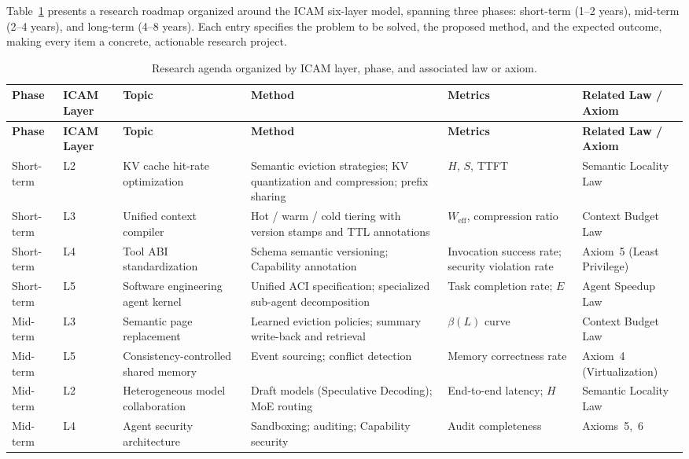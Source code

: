 \documentclass[11pt,a4paper]{article}
\newcounter{axiom}[section]
\begin{document}
Table~\ref{tab:roadmap} presents a research roadmap organized around the ICAM six-layer model, spanning three phases: short-term (1--2 years), mid-term (2--4 years), and long-term (4--8 years). Each entry specifies the problem to be solved, the proposed method, and the expected outcome, making every item a concrete, actionable research project.

\footnotesize
\renewcommand{\arraystretch}{1.35}
\begin{longtable}{p{}p{}p{}p{}p{}p{}}
\caption{Research agenda organized by ICAM layer, phase, and associated law or axiom.}
\label{tab:roadmap}\\
\toprule
\textbf{Phase} & \textbf{ICAM Layer} & \textbf{Topic} & \textbf{Method} & \textbf{Metrics} & \textbf{Related Law / Axiom} \\
\midrule
\endfirsthead
\toprule
\textbf{Phase} & \textbf{ICAM Layer} & \textbf{Topic} & \textbf{Method} & \textbf{Metrics} & \textbf{Related Law / Axiom} \\
\midrule
\endhead

Short-term & L2 & KV cache hit-rate optimization & Semantic eviction strategies; KV quantization and compression; prefix sharing & $H$, $S$, TTFT & Semantic Locality Law \\[3pt]
Short-term & L3 & Unified context compiler & Hot / warm / cold tiering with version stamps and TTL annotations & $W_{\mathrm{eff}}$, compression ratio & Context Budget Law \\[3pt]
Short-term & L4 & Tool ABI standardization & Schema semantic versioning; Capability annotation & Invocation success rate; security violation rate & Axiom~5 (Least Privilege) \\[3pt]
Short-term & L5 & Software engineering agent kernel & Unified ACI specification; specialized sub-agent decomposition & Task completion rate; $E$ & Agent Speedup Law \\[3pt]

Mid-term & L3 & Semantic page replacement & Learned eviction policies; summary write-back and retrieval & $\beta(L)$ curve & Context Budget Law \\[3pt]
Mid-term & L5 & Consistency-controlled shared memory & Event sourcing; conflict detection & Memory correctness rate & Axiom~4 (Virtualization) \\[3pt]
Mid-term & L2 & Heterogeneous model collaboration & Draft models (Speculative Decoding); MoE routing & End-to-end latency; $H$ & Semantic Locality Law \\[3pt]
Mid-term & L4 & Agent security architecture & Sandboxing; auditing; Capability security & Audit completeness & Axioms~5,~6 \\[3pt]


\end{longtable}
\end{document}
